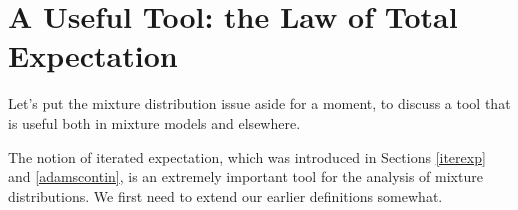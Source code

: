 \documentclass[11pt]{article}
\begin{document}
% 
% 
% 
% 
% 
% 
% 
% 
% 
% 
% 

\section{A Useful Tool:  the Law of Total Expectation}
\label{lte}

Let's put the mixture distribution issue aside for a moment, to discuss
a tool that is useful both in mixture models and elsewhere.

The notion of iterated expectation, which was introduced in Sections
\ref{iterexp} and \ref{adamscontin}, is an extremely important
tool for the analysis of mixture distributions.  We first need to extend
our earlier definitions somewhat.
\end{document}
